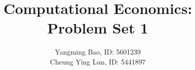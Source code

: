 \documentclass[11pt]{article}
\title{Computational Economics: Problem Set 1}
\date{}
\author{Yangming Bao, ID: 5601239\\Cheung Ying Lun, ID: 5441897}
\begin{document}
\maketitle





\pagebreak
\appendix

\end{document}
